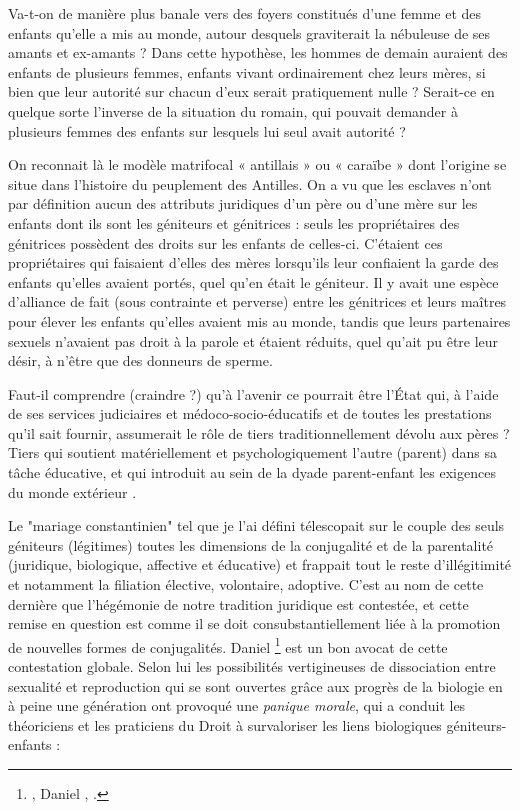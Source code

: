  Va-t-on de manière plus banale vers des foyers constitués d'une femme et des enfants qu'elle a mis au monde, autour desquels graviterait la nébuleuse de ses amants et ex-amants ? Dans cette hypothèse, les hommes de demain auraient des enfants de plusieurs femmes, enfants vivant ordinairement chez leurs mères, si bien que leur autorité sur chacun d'eux serait pratiquement nulle ? Serait-ce en quelque sorte l'inverse de la situation du  romain, qui pouvait demander à plusieurs femmes des enfants sur lesquels lui seul avait autorité ? 
 
 On reconnait là le modèle matrifocal « antillais » ou « caraïbe » dont l'origine se situe dans l'histoire du peuplement des Antilles. On a vu que les esclaves n'ont par définition aucun des attributs juridiques d'un père ou d'une mère sur les enfants dont ils sont les géniteurs et génitrices : seuls les propriétaires des génitrices possèdent des droits sur les enfants de celles-ci. C'étaient ces propriétaires qui faisaient d'elles des mères lorsqu'ils leur confiaient la garde des enfants qu'elles avaient portés, quel qu'en était le géniteur. Il y avait une espèce d'alliance de fait (sous contrainte et perverse) entre les génitrices et leurs maîtres pour élever les enfants qu'elles avaient mis au monde, tandis que leurs partenaires sexuels n'avaient pas droit à la parole et étaient réduits, quel qu'ait pu être leur désir,  à n'être que des donneurs de sperme. 
 

 
 Faut-il comprendre (craindre ?) qu'à l'avenir ce pourrait être l'État qui, à l'aide de ses services judiciaires et médoco-socio-éducatifs et de toutes les prestations qu'il sait fournir, assumerait le rôle de tiers traditionnellement dévolu aux pères ? Tiers qui soutient matériellement et psychologiquement l'autre (parent) dans sa tâche éducative, et qui introduit au sein de la dyade parent-enfant les exigences du monde extérieur .
 
 Le "mariage constantinien" tel que je l'ai défini télescopait sur le couple des seuls géniteurs (légitimes) toutes les dimensions de la conjugalité et de la parentalité (juridique, biologique, affective et éducative) et frappait tout le reste d'illégitimité et notamment la filiation élective, volontaire, adoptive. C'est au nom de cette dernière que l'hégémonie de notre tradition juridique est contestée, et cette remise en question est comme il se doit consubstantiellement liée à la promotion de nouvelles formes de conjugalités. Daniel 
\footnote{\href{http://www.universalis.fr/encyclopedie/famille-les-enjeux-de-la-parentalite/}{}, Daniel , .} est un bon avocat de cette contestation globale. Selon lui les possibilités vertigineuses de dissociation entre sexualité et reproduction qui se sont ouvertes grâce aux progrès de la biologie en à peine une génération ont provoqué une\emph{ panique morale}, qui a conduit les théoriciens et les praticiens du Droit à survaloriser les liens biologiques géniteurs-enfants : 

